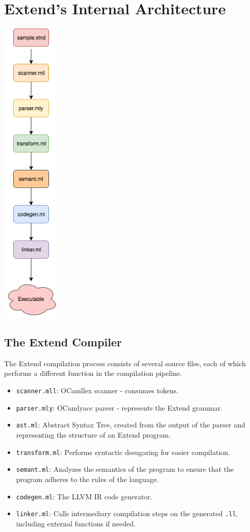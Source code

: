 \chapter{Extend's Internal Architecture}

\begin{center}
  \includegraphics[width=.20\textwidth, height=15cm]{img/Execution.png}
\end{center}

\newpage

\section{The Extend Compiler}
The Extend compilation process consists of several source files, each of which performs a different function in the compilation pipeline.

\begin{itemize}
  \item \texttt{scanner.mll}: OCamllex scanner - consumes tokens.
  \item \texttt{parser.mly}: OCamlyacc parser - represents the Extend grammar.
  \item \texttt{ast.ml}: Abstract Syntax Tree, created from the output of the parser and representing the structure of an Extend program.
  \item \texttt{transform.ml}: Performs syntactic desugaring for easier compilation.
  \item \texttt{semant.ml}: Analyzes the semantics of the program to ensure that the program adheres to the rules of the language.
  \item \texttt{codegen.ml}: The LLVM IR code generator.
  \item \texttt{linker.ml}: Calls intermediary compilation steps on the generated \texttt{.ll}, including external functions if needed.
\end{itemize}

